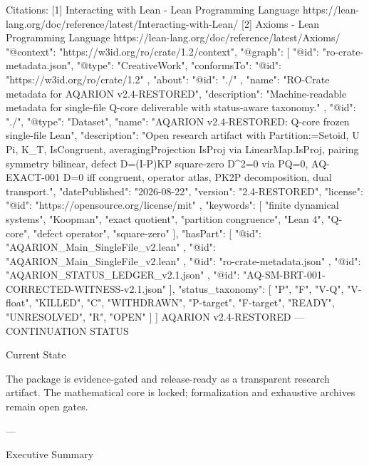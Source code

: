 Citations:
[1] Interacting with Lean - Lean Programming Language https://lean-lang.org/doc/reference/latest/Interacting-with-Lean/
[2] Axioms - Lean Programming Language https://lean-lang.org/doc/reference/latest/Axioms/
{
  "@context": "https://w3id.org/ro/crate/1.2/context",
  "@graph": [
    {
      "@id": "ro-crate-metadata.json",
      "@type": "CreativeWork",
      "conformsTo": {
        "@id": "https://w3id.org/ro/crate/1.2"
      },
      "about": {
        "@id": "./"
      },
      "name": "RO-Crate metadata for AQARION v2.4-RESTORED",
      "description": "Machine-readable metadata for single-file Q-core deliverable with status-aware taxonomy."
    },
    {
      "@id": "./",
      "@type": "Dataset",
      "name": "AQARION v2.4-RESTORED: Q-core frozen single-file Lean",
      "description": "Open research artifact with Partition:=Setoid, U Pi, K_T, IsCongruent, averagingProjection IsProj via LinearMap.IsProj, pairing symmetry bilinear, defect D=(I-P)KP square-zero D^2=0 via PQ=0, AQ-EXACT-001 D=0 iff congruent, operator atlas, PK2P decomposition, dual transport.",
      "datePublished": "2026-08-22",
      "version": "2.4-RESTORED",
      "license": {
        "@id": "https://opensource.org/license/mit"
      },
      "keywords": [
        "finite dynamical systems",
        "Koopman",
        "exact quotient",
        "partition congruence",
        "Lean 4",
        "Q-core",
        "defect operator",
        "square-zero"
      ],
      "hasPart": [
        {
          "@id": "AQARION_Main_SingleFile_v2.lean"
        },
        {
          "@id": "AQARION_Main_SingleFile_v2.lean"
        },
        {
          "@id": "ro-crate-metadata.json"
        },
        {
          "@id": "AQARION_STATUS_LEDGER_v2.1.json"
        },
        {
          "@id": "AQ-SM-BRT-001-CORRECTED-WITNESS-v2.1.json"
        }
      ],
      "status_taxonomy": [
        "P",
        "F",
        "V-Q",
        "V-float",
        "KILLED",
        "C",
        "WITHDRAWN",
        "P-target",
        "F-target",
        "READY",
        "UNRESOLVED",
        "R",
        "OPEN"
      ]
    }
  ]
}
AQARION v2.4-RESTORED — CONTINUATION STATUS

Current State

The package is evidence-gated and release-ready as a transparent research artifact. The mathematical core is locked; formalization and exhaustive archives remain open gates.

---

Executive Summary


